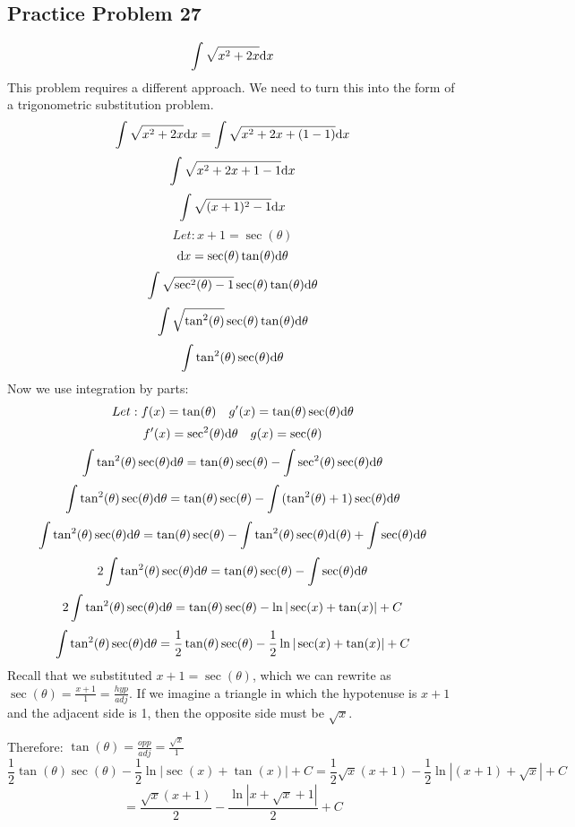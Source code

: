 \documentclass[letterpaper, 12pt]{math}
\begin{document}
\subsection*{Practice Problem 27}
\[ \int{\sqrt{x^{2}+2x}\mathrm{d}{x}} \]
This problem requires a different approach. We need to turn this into the form
of a trigonometric substitution problem.
\[ \int{\sqrt{x^{2}+2x}\mathrm{d}{x}} = \int{\sqrt{x^{2}+2x+(1-1)}\mathrm{d}{x}} \]
\[ \int{\sqrt{x^{2}+2x+1-1}\mathrm{d}{x}} \]
\[ \int{\sqrt{(x+1)^{2}-1}\mathrm{d}{x}} \]
\[ Let: x+1 = \sec(\theta) \]
\[ \mathrm{d}{x} = \sec(\theta)\tan(\theta)\mathrm{d}{\theta} \]
\[ \int{\sqrt{\sec^{2}(\theta)-1}\sec(\theta)\tan(\theta)\mathrm{d}{\theta}} \]
\[ \int{\sqrt{\tan^{2}(\theta)}\sec(\theta)\tan(\theta)\mathrm{d}{\theta}} \]
\[ \int{\tan^{2}(\theta)\sec(\theta)\mathrm{d}{\theta}} \]
Now we use integration by parts:
\[ Let: f(x) = \tan(\theta) \quad
   g'(x) = \tan(\theta)\sec(\theta)\mathrm{d}{\theta} \]
\[ f'(x) = \sec^{2}(\theta)\mathrm{d}{\theta} \quad g(x) = \sec(\theta) \]
\[ \int{\tan^{2}(\theta)\sec(\theta)\mathrm{d}{\theta}} =
   \tan(\theta)\sec(\theta)-\int{\sec^{2}(\theta)\sec(\theta)\mathrm{d}{\theta}} \]
\[ \int{\tan^{2}(\theta)\sec(\theta)\mathrm{d}{\theta}} =
   \tan(\theta)\sec(\theta)-
   \int{(\tan^{2}(\theta)+1)\sec(\theta)\mathrm{d}{\theta}} \]
\[ \int{\tan^{2}(\theta)\sec(\theta)\mathrm{d}{\theta}} =
   \tan(\theta)\sec(\theta)-\int{\tan^{2}(\theta)\sec(\theta)\mathrm{d}(\theta)}+
   \int{\sec(\theta)\mathrm{d}{\theta}} \]
\[ 2\int{\tan^{2}(\theta)\sec(\theta)\mathrm{d}{\theta}} =
   \tan(\theta)\sec(\theta)-\int{\sec(\theta)\mathrm{d}{\theta}} \]
\[ 2\int{\tan^{2}(\theta)\sec(\theta)\mathrm{d}{\theta}} =
   \tan(\theta)\sec(\theta)-\ln|\sec(x)+\tan(x)|+C \]
\[ \int{\tan^{2}(\theta)\sec(\theta)\mathrm{d}{\theta}} =
   \frac{1}{2}\tan(\theta)\sec(\theta)-\frac{1}{2}\ln|\sec(x)+\tan(x)|+C \]
Recall that we substituted \( x+1 = \sec(\theta) \), which we can rewrite as
\( \sec(\theta) = \frac{x+1}{1} = \frac{hyp}{adj} \). If we imagine a triangle
in which the hypotenuse is \( x+1 \) and the adjacent side is 1, then the
opposite side must be \( \sqrt{x} \).
\begin{center}
\end{center}
Therefore: \( \tan(\theta) = \frac{opp}{adj} = \frac{\sqrt{x}}{1} \)
\[ \frac{1}{2}\tan(\theta)\sec(\theta)-\frac{1}{2}\ln|\sec(x)+\tan(x)|+C =
   \frac{1}{2}\sqrt{x}(x+1)-\frac{1}{2}\ln|(x+1)+\sqrt{x}|+C \]
\[ = \frac{\sqrt{x}(x+1)}{2}-\frac{\ln|x+\sqrt{x}+1|}{2}+C \]
\end{document}
